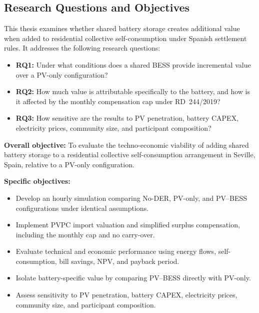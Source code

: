 \subsection{Research Questions and Objectives}

This thesis examines whether shared battery storage creates additional value when added to residential collective self-consumption under Spanish settlement rules. It addresses the following research questions:

\begin{itemize}
    \item \textbf{RQ1:} Under what conditions does a shared BESS provide incremental value over a PV-only configuration?

    \item \textbf{RQ2:} How much value is attributable specifically to the
    battery, and how is it affected by the monthly compensation cap under
    RD~244/2019?

    \item \textbf{RQ3:} How sensitive are the results to PV penetration,
    battery CAPEX, electricity prices, community size, and participant
    composition?
\end{itemize}

\textbf{Overall objective:} To evaluate the techno-economic viability of adding shared battery storage to a residential collective self-consumption arrangement in Seville, Spain, relative to a PV-only configuration.

\textbf{Specific objectives:}

\begin{itemize}
    \item Develop an hourly simulation comparing No-DER, PV-only, and PV--BESS configurations under identical assumptions.

    \item Implement PVPC import valuation and simplified surplus compensation, including the monthly cap and no carry-over.

    \item Evaluate technical and economic performance using energy flows, self-consumption, bill savings, NPV, and payback period.

    \item Isolate battery-specific value by comparing PV--BESS directly with PV-only.

    \item Assess sensitivity to PV penetration, battery CAPEX, electricity prices, community size, and participant composition.
\end{itemize}

